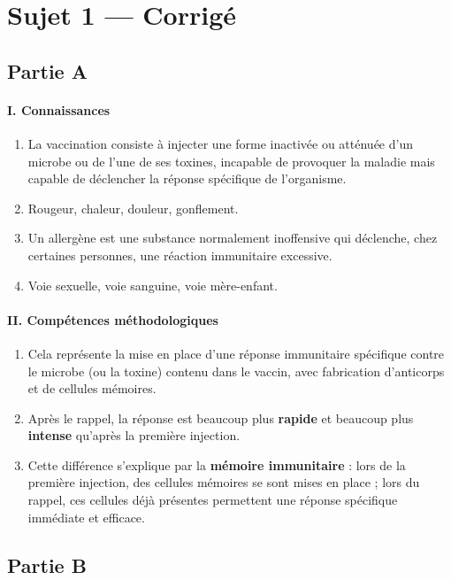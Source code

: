\section{Sujet 1 — Corrigé}

\subsection*{Partie A}

\paragraph{I. Connaissances}
\begin{enumerate}[label=\arabic*)]
\item La vaccination consiste à injecter une forme inactivée ou atténuée d'un microbe
ou de l'une de ses toxines, incapable de provoquer la maladie mais capable de
déclencher la réponse spécifique de l'organisme.
\item Rougeur, chaleur, douleur, gonflement.
\item Un allergène est une substance normalement inoffensive qui déclenche, chez
certaines personnes, une réaction immunitaire excessive.
\item Voie sexuelle, voie sanguine, voie mère-enfant.
\end{enumerate}

\paragraph{II. Compétences méthodologiques}
\begin{enumerate}[label=\arabic*)]
\item Cela représente la mise en place d'une réponse immunitaire spécifique contre le
microbe (ou la toxine) contenu dans le vaccin, avec fabrication d'anticorps et de
cellules mémoires.
\item Après le rappel, la réponse est beaucoup plus \textbf{rapide} et beaucoup plus
\textbf{intense} qu'après la première injection.
\item Cette différence s'explique par la \textbf{mémoire immunitaire} : lors de la
première injection, des cellules mémoires se sont mises en place ; lors du rappel,
ces cellules déjà présentes permettent une réponse spécifique immédiate et efficace.
\end{enumerate}

\subsection*{Partie B}

